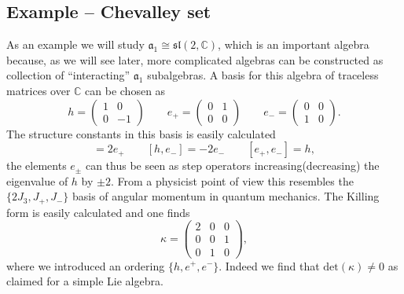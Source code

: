 \subsection{Example -- Chevalley set}
As an example we will study $\mathfrak{a}_1\cong\mathfrak{sl}(2,\mathbb{C})$, which is an important algebra because, as we will see later, more complicated algebras can be constructed as collection of ``interacting'' $\mathfrak{a}_1$ subalgebras. A basis for this algebra of traceless matrices over $\mathbb{C}$ can be chosen as 
\begin{equation}
    h=\begin{pmatrix}1&0\\0 &-1\end{pmatrix}\qquad e_+=\begin{pmatrix}0&1\\0 &0\end{pmatrix}\qquad e_-=\begin{pmatrix}0&0\\1 &0\end{pmatrix}.
\end{equation}
The structure constants in this basis is easily calculated 
\begin{equation}
    [h,e_+] = 2e_+\qquad [h,e_-]=-2e_- \qquad [e_+,e_-]=h,
\end{equation}
the elements $e_{\pm}$ can thus be seen as step operators increasing(decreasing) the eigenvalue of $h$ by $\pm 2$. From a physicist point of view this resembles the $\{2J_3,J_+,J_-\}$ basis of angular momentum in quantum mechanics. The Killing form is easily calculated and one finds 
\begin{equation}
    \kappa = \begin{pmatrix}2&0&0\\0&0&1\\0&1&0\end{pmatrix},
\end{equation}
where we introduced an ordering $\{h,e^+,e^-\}$. Indeed we find that $\text{det}(\kappa)\neq 0$ as claimed for a simple Lie algebra.


